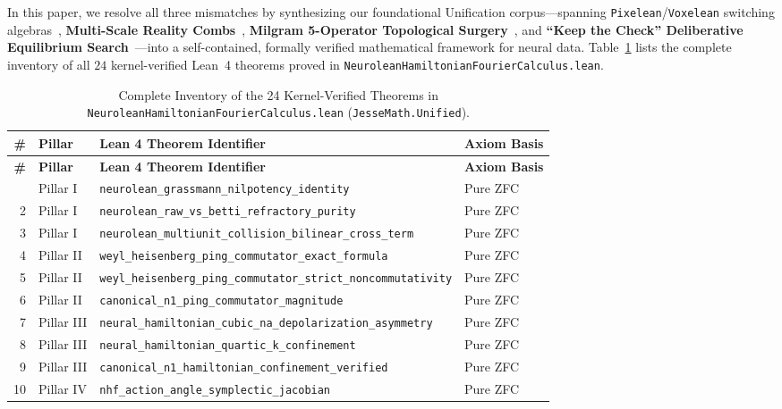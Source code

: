 \documentclass[11pt,letterpaper]{article}
\newcommand{\lean}[1]{\nolinkurl{#1}}
\theoremstyle{definition}
\begin{document}
In this paper, we resolve all three mismatches by synthesizing our foundational Unification corpus---spanning \texttt{Pixelean}/\texttt{Voxelean} switching algebras~\cite{solidsf_pixelean2026}, \textbf{Multi-Scale Reality Combs}~\cite{solidsf_reality_comb2026}, \textbf{Milgram 5-Operator Topological Surgery}~\cite{solidsf_milgram2026}, and \textbf{``Keep the Check'' Deliberative Equilibrium Search}~\cite{solidsf_lecun2026}---into a self-contained, formally verified mathematical framework for neural data. Table~\ref{tab:theorem_inventory} lists the complete inventory of all $24$ kernel-verified Lean~4 theorems proved in \texttt{Neurolean\-Hamiltonian\-Fourier\-Calculus.lean}.

\begin{footnotesize}
\begin{longtable}{@{}rl>{\raggedright\arraybackslash}p{3.95in}l@{}}
\caption{Complete Inventory of the 24 Kernel-Verified Theorems in \texttt{Neurolean\-Hamiltonian\-Fourier\-Calculus.lean} (\nolinkurl{JesseMath.Unified}).}
\label{tab:theorem_inventory} \\
\toprule
\textbf{\#} & \textbf{Pillar} & \textbf{Lean 4 Theorem Identifier} & \textbf{Axiom Basis} \\
\midrule
\endfirsthead
\toprule
\textbf{\#} & \textbf{Pillar} & \textbf{Lean 4 Theorem Identifier} & \textbf{Axiom Basis} \\
\midrule
\endhead
\bottomrule
\endfoot
1 & Pillar I & \lean{neurolean_grassmann_nilpotency_identity} & Pure ZFC \\
2 & Pillar I & \lean{neurolean_raw_vs_betti_refractory_purity} & Pure ZFC \\
3 & Pillar I & \lean{neurolean_multiunit_collision_bilinear_cross_term} & Pure ZFC \\
4 & Pillar II & \lean{weyl_heisenberg_ping_commutator_exact_formula} & Pure ZFC \\
5 & Pillar II & \lean{weyl_heisenberg_ping_commutator_strict_noncommutativity} & Pure ZFC \\
6 & Pillar II & \lean{canonical_n1_ping_commutator_magnitude} & Pure ZFC \\
7 & Pillar III & \lean{neural_hamiltonian_cubic_na_depolarization_asymmetry} & Pure ZFC \\
8 & Pillar III & \lean{neural_hamiltonian_quartic_k_confinement} & Pure ZFC \\
9 & Pillar III & \lean{canonical_n1_hamiltonian_confinement_verified} & Pure ZFC \\
10 & Pillar IV & \lean{nhf_action_angle_symplectic_jacobian} & Pure ZFC \\

\end{longtable}
\end{footnotesize}
\end{document}
